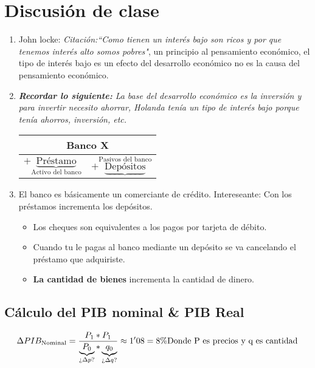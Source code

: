 \section{Discusión de clase}
\begin{enumerate}
    \item John locke: \emph{Citación:``Como tienen un interés bajo son ricos y por que tenemos interés alto somos pobres"}, un principio al pensamiento económico, el tipo de interés bajo es un efecto del desarrollo económico no es la causa del pensamiento económico.
    \item \emph{\textbf{Recordar lo siguiente: }La base del desarrollo económico es la inversión y para invertir necesito ahorrar, Holanda tenía un tipo de interés bajo porque tenía ahorros, inversión, etc.}
        \begin{center}
        \begin{tabular}{ | p{5cm} | p{5cm} | }
         \hline
        \multicolumn{2}{|c|}{Banco X} \\
        \hline  
        $+\underbrace{\text{Préstamo}}_{\text{Activo del banco}}$ & $+\underbrace{\text{Depósitos}}^{\text{Pasivos del banco}}$ \\ 
         \hline
        \end{tabular}
        \end{center}
    
    \item El banco es básicamente un comerciante de crédito. Intereseante: Con los préstamos incrementa los depósitos. 
        \begin{itemize}
            \item Los cheques son equivalentes a los pagos por tarjeta de débito.
            \item Cuando tu le pagas al banco mediante un depósito se va cancelando el préstamo que adquiriste.
            \item \textbf{La cantidad de bienes} incrementa la cantidad de dinero.  
        \end{itemize}
\end{enumerate}

\subsection{Cálculo del PIB nominal \& PIB Real}

\[
  \Delta PIB_{\text{Nominal}} = \frac{P_{1}*P_{1}}{\underbrace{P_{0}}_{\text{¿$\Delta p$?}}* \underbrace{q_{0}}_{\text{¿$\Delta q$?}}} \approx 1'08 = 8\% \\ 
  \text{Donde P es precios y q es cantidad}
\]


